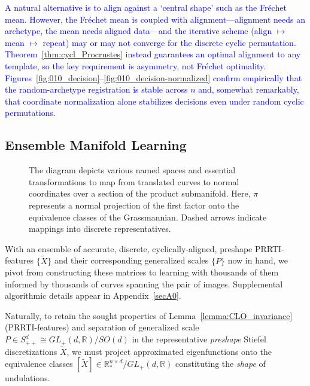 \documentclass[pdflatex,iicol]{sn-jnl}%
\theoremstyle{thmstyleone}%
\theoremstyle{thmstyletwo}%
\theoremstyle{thmstylethree}%
\begin{document}
\textcolor{blue}{A natural alternative is to align against a `central shape' such as the Fr\'echet mean. However, the Fr\'echet mean is coupled with alignment---alignment needs an archetype, the mean needs aligned data---and the iterative scheme (align $\mapsto$ mean $\mapsto$ repeat) may or may not converge for the discrete cyclic permutation. Theorem~\ref{thm:cycl_Procrustes} instead guarantees an optimal alignment to any template, so the key requirement is asymmetry, not Fr\'echet optimality. Figures~\ref{fig:010_decision}--\ref{fig:010_decision-normalized} confirm empirically that the random-archetype registration is stable across $n$ and, somewhat remarkably, that coordinate normalization alone stabilizes decisions even under random cyclic permutations.}


\subsection{Ensemble Manifold Learning} \label{subsec:mfld_learn}
\begin{figure}
    \centering
    
    \caption{The diagram depicts various named spaces and essential transformations to map from translated curves to normal coordinates over a section of the product submanifold. Here, $\pi$ represents a normal projection of the first factor onto the equivalence classes of the Grassmannian. Dashed arrows indicate mappings into discrete representatives.}
    \label{fig:placeholder}
\end{figure}
With an ensemble of accurate, discrete, cyclically-aligned, preshape PRRTI-features $\lbrace \widetilde{X}\rbrace$ and their corresponding generalized scales $\lbrace P\rbrace$ now in hand, we pivot from constructing these matrices to learning with thousands of them informed by thousands of curves spanning the pair of images. Supplemental algorithmic details appear in Appendix~\ref{secA0}.

Naturally, to retain the sought properties of Lemma~\ref{lemma:CLO_invariance} (PRRTI-features) and separation of generalized scale $P \in S^d_{++} \cong GL_+(d, \mathbb{R})/SO(d)$ in the representative \textit{preshape} Stiefel discretizations $\widetilde{X}$, we must project approximated eigenfunctions onto the equivalence classes $[\widetilde{X}] \in \mathbb{R}^{n \times d}_*/GL_+(d, \mathbb{R})$ constituting the \textit{shape} of undulations. 
\end{document}
